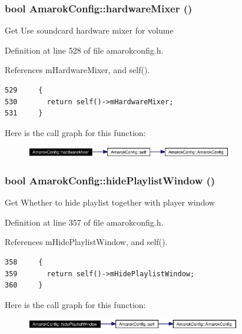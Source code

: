 \subsubsection{\setlength{\rightskip}{0pt plus 5cm}bool Amarok\-Config::hardware\-Mixer ()\hspace{0.3cm}{\tt  [inline, static]}}\label{classAmarokConfig_AmarokConfige54}


Get Use soundcard hardware mixer for volume 

Definition at line 528 of file amarokconfig.h.

References m\-Hardware\-Mixer, and self().



\footnotesize\begin{verbatim}529     {
530       return self()->mHardwareMixer;
531     }
\end{verbatim}\normalsize 


Here is the call graph for this function:\begin{figure}[H]
\begin{center}
\leavevmode
\includegraphics[width=256pt]{classAmarokConfig_AmarokConfige54_cgraph}
\end{center}
\end{figure}
\subsubsection{\setlength{\rightskip}{0pt plus 5cm}bool Amarok\-Config::hide\-Playlist\-Window ()\hspace{0.3cm}{\tt  [inline, static]}}\label{classAmarokConfig_AmarokConfige36}


Get Whether to hide playlist together with player window 

Definition at line 357 of file amarokconfig.h.

References m\-Hide\-Playlist\-Window, and self().



\footnotesize\begin{verbatim}358     {
359       return self()->mHidePlaylistWindow;
360     }
\end{verbatim}\normalsize 


Here is the call graph for this function:\begin{figure}[H]
\begin{center}
\leavevmode
\includegraphics[width=266pt]{classAmarokConfig_AmarokConfige36_cgraph}
\end{center}
\end{figure}
